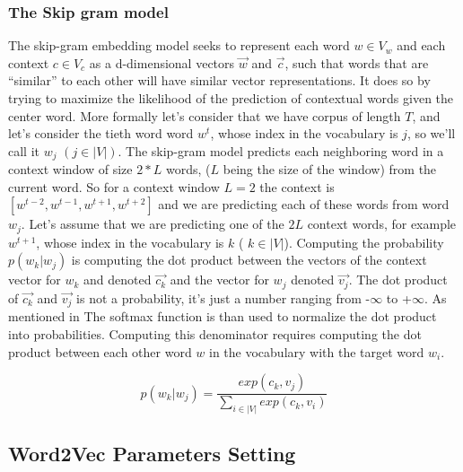 \documentclass{article}
\begin{document}
\subsubsection{The Skip gram model}  
The skip-gram embedding model  seeks to represent each word $w \in V_{w}$ and each context $c \in V_{c}$ as a  d-dimensional vectors $\vec{w}$ and $\vec{c}$, such that words that are “similar” to each other will have similar vector representations.
It does so by trying to maximize the likelihood of the prediction of contextual words given the center word. More formally
let's consider that we have corpus of length $T$, and let's consider the tieth word word $w^{t}$, whose index in the vocabulary is $j$, so we'll call it $w_{j}$  $(  j \in |V|)$. The skip-gram model predicts each neighboring word in a context window of size $2*L$ words, ($L$ being the size of the window)  from the current word. So for a context window
$L = 2$ the context is $[w^{t-2}, w^{t-1}, w^{t+1}, w^{t+2}] $ and we are predicting each of these  words from word $w_{j}$. Let's assume that we are predicting one of the $2L$ context words, for example $w^{t+1}$, whose index in the vocabulary is $k$ ( $k \in  |V|$). Computing the probability $p(w_{k}|w_{j})$ is computing the dot product between the vectors of the context vector for $w_{k}$ and denoted $\vec{c_{k}}$ and  the vector for $w_{j}$ denoted $\vec{v_{j}}$. The dot product of $\vec{c_{k}}$ and $\vec{v_{j}}$ is not a probability, it's just a number ranging from -$\infty$ to +$\infty$. As mentioned in \cite{mikolov:2013} The softmax function is than used  to normalize the dot product into probabilities. Computing this denominator requires computing the dot product between each other word $w$ in the vocabulary with the target word $w_{i}$.

$$ p(w_{k}|w_{j})=\frac{exp(c_{k},v_{j})}{ \sum_{i \in |V| }exp(c_{k},v_{i}) }$$





\subsection{Word2Vec Parameters Setting}
\end{document}
